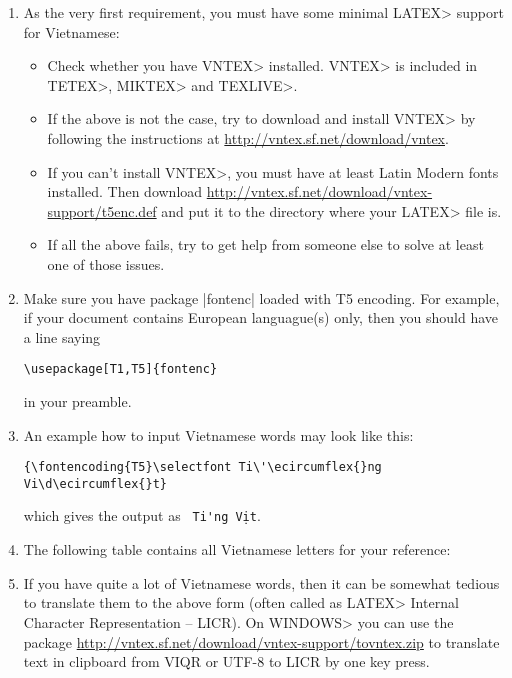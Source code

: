\documentclass[a4paper,12pt]{article}
\begin{document}
\begin{enumerate}
\item As the very first requirement, you must have some minimal \<LATEX>
support for Vietnamese:
\begin{itemize}
\item Check whether you have \<VNTEX> installed. \<VNTEX> is included
in \<TETEX>, \<MIKTEX> and \<TEXLIVE>. 

\item If the above is not the case, try to download and install \<VNTEX> by
following the instructions at \url{http://vntex.sf.net/download/vntex}.

\item If you can't install \<VNTEX>, you must have at least Latin Modern
fonts installed. Then download
\url{http://vntex.sf.net/download/vntex-support/t5enc.def} and put it to the
directory where your \<LATEX> file is.

\item If all the above fails, try to get help from someone else to solve
at least one of those issues.
\end{itemize}

\item  Make sure you have package |fontenc| loaded with T5 encoding. For
example, if your document contains European languague(s) only, then you
should have a line saying

\begin{verbatim}
\usepackage[T1,T5]{fontenc}
\end{verbatim}

in your preamble.

\item An example how to input Vietnamese words may look like this:

\begin{verbatim}
{\fontencoding{T5}\selectfont Ti\'\ecircumflex{}ng Vi\d\ecircumflex{}t}
\end{verbatim}

which gives the output as \texttt{\selectfont
Ti\'\ecircumflex{}ng Vi\d\ecircumflex{}t}.

\item The following table contains all Vietnamese letters for your
reference:

{\selectfont

}

\item If you have quite a lot of Vietnamese words, then it can be somewhat
tedious to translate them to the above form (often called as \<LATEX>
Internal Character Representation -- LICR). On \<WINDOWS> you can use the
package \url{http://vntex.sf.net/download/vntex-support/tovntex.zip}
to translate text in clipboard from VIQR or UTF-8 to LICR by one key press.


\end{enumerate}
\end{document}
